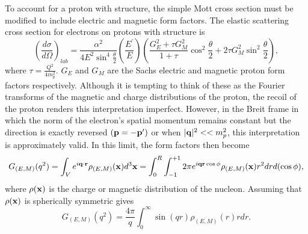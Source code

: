 To account for a proton with structure, the simple Mott cross section must be modified to include electric and magnetic form factors. The elastic scattering cross section for electrons on protons with structure is 
\begin{equation}
\left(\frac{d\sigma}{d\Omega}\right)_{lab}=\frac{\alpha^2}{4E^2\sin^4\frac{\theta}{2}}\left(\frac{E^{\prime}}{E}\right)\left(\frac{G_E^2+\tau G_M^2}{1+\tau}\cos^2\frac{\theta}{2}+2\tau G_M^2\sin^2\frac{\theta}{2}\right),
\label{eq:proton_cx}
\end{equation} 
where $\tau=\frac{Q^2}{4m_p^2}$. $G_E$ and $G_M$ are the Sachs electric and magnetic proton form factors respectively. Although it is tempting to think of these as the Fourier transforms of the magnetic and charge distributions of the proton, the recoil of the proton renders this interpretation imperfect. However, in the Breit frame in which the norm of the electron's spatial momentum remains constant but the direction is exactly reversed $({\bf p}=-{\bf p}^{\prime})$ or when $|{\bf q}|^2<<m_p^2$, this interpretation is approximately valid\cite{Halzen}. In this limit, the form factors then become
\begin{equation}
G_{(E,M)}(q^2) = \int_V e^{i{\bf q\cdot r}}\rho_{(E,M)}({\bf x})d^3{\bf x}= \int_0^R\int_{-1}^{+1}2\pi e^{i{\bf qr\cos\phi}}\rho_{(E,M)}({\bf x})r^2drd(\cos\phi),
\label{eq:fourier_ff}
\end{equation}
where $\rho({\bf x})$ is the charge or magnetic distribution of the nucleon.  Assuming that $\rho({\bf x})$ is spherically symmetric gives
\[
G_{(E,M)}(q^2) =\frac{4\pi}{q}\int_0^{\infty}\sin(qr)\rho_{(E,M)}(r)rdr.
\]

